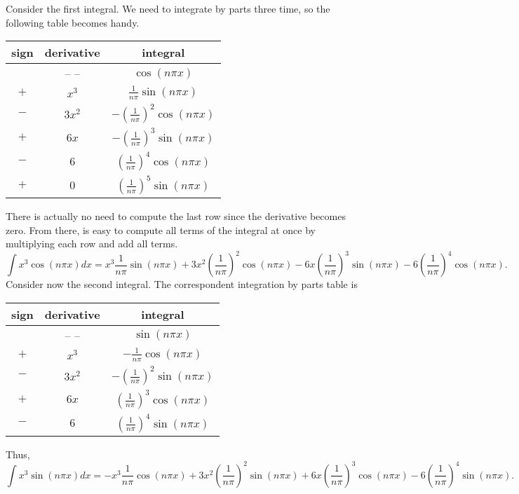 \documentclass[11pt]{article}
\begin{document}
\begin{solution}
Consider the first integral. We need to integrate by parts three time, so the following table becomes handy.
\begin{center}
\begin{tabular}{c|c|c}
sign & derivative & integral \\
\hline
    &  -- --   & $ \cos(n\pi x)$ \\
$+$ & $x^{3}$  & $ \frac{1}{n \pi} \sin(n\pi x)$ \\
$-$ & $3x^{2}$ & $-\left( \frac{1}{n \pi} \right)^{2} \cos(n\pi x)$ \\
$+$ & $6x$     & $-\left( \frac{1}{n \pi} \right)^{3} \sin(n\pi x)$ \\
$-$ & $6$      & $ \left( \frac{1}{n \pi} \right)^{4} \cos(n\pi x)$ \\
$+$ & $0$      & $ \left( \frac{1}{n \pi} \right)^{5} \sin(n\pi x)$
\end{tabular}
\end{center}
There is actually no need to compute the last row since the derivative becomes zero. From there, is easy to compute all terms of the integral at once by multiplying each row and add all terms.
\[ \boxed{\int x^{3}\cos(n\pi x)dx = x^{3}\frac{1}{n\pi}\sin(n \pi x) + 3x^{2}\left( \frac{1}{n \pi} \right)^{2} \cos(n\pi x) - 6x\left( \frac{1}{n \pi} \right)^{3} \sin(n\pi x) - 6\left( \frac{1}{n \pi} \right)^{4} \cos(n\pi x)}.\]
Consider now the second integral. The correspondent integration by parts table is
\begin{center}
\begin{tabular}{c|c|c}
sign & derivative & integral \\
\hline
    &   -- --  & $ \sin(n\pi x)$ \\
$+$ & $x^{3}$  & $-\frac{1}{n \pi} \cos(n\pi x)$ \\
$-$ & $3x^{2}$ & $-\left( \frac{1}{n \pi} \right)^{2} \sin(n\pi x)$ \\
$+$ & $6x$     & $ \left( \frac{1}{n \pi} \right)^{3} \cos(n\pi x)$ \\
$-$ & $6$      & $ \left( \frac{1}{n \pi} \right)^{4} \sin(n\pi x)$
\end{tabular}
\end{center}
Thus, 
\[\boxed{\int x^{3}\sin(n\pi x)dx = - x^{3}\frac{1}{n \pi} \cos(n\pi x) + 3x^{2}\left( \frac{1}{n \pi} \right)^{2} \sin(n\pi x) + 6x \left( \frac{1}{n \pi} \right)^{3} \cos(n\pi x) - 6\left( \frac{1}{n \pi} \right)^{4} \sin(n\pi x)}.\]


\end{solution}
\end{document}

